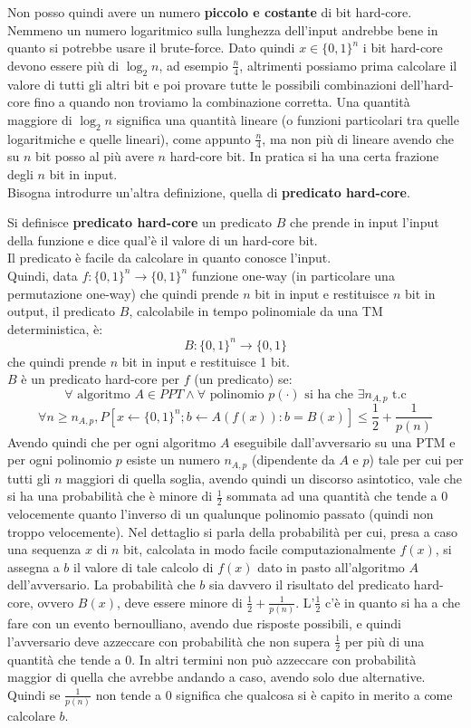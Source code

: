 \documentclass[a4paper,12pt, oneside]{book}
\begin{document}
Non posso quindi avere un numero \textbf{piccolo e costante} di bit hard-core.\\
Nemmeno un numero logaritmico sulla lunghezza dell'input andrebbe bene in
quanto si potrebbe usare il brute-force. Dato quindi $x\in\{0,1\}^n$ i bit
hard-core devono essere più di $\log_2n$, ad esempio $\frac{n}{4}$, altrimenti
possiamo prima calcolare il valore di tutti gli altri bit e poi provare tutte le
possibili combinazioni dell'hard-core fino a quando non troviamo la combinazione
corretta. Una quantità maggiore di $\log_2n$ significa una quantità lineare (o
funzioni particolari tra quelle logaritmiche e quelle lineari), come appunto
$\frac{n}{4}$, ma non più di 
lineare avendo che su $n$ bit posso al più avere $n$ hard-core bit. In pratica
si ha una certa frazione degli $n$ bit in input.\\
Bisogna introdurre un'altra definizione, quella di \textbf{predicato hard-core}.
\begin{definizione}
  Si definisce \textbf{predicato hard-core} un predicato $B$ che prende in input
  l'input della funzione e dice qual'è il valore di un hard-core bit.\\
  Il predicato è facile da calcolare in quanto conosce l'input.\\
  Quindi, data $f:\{0,1\}^n\to\{0,1\}^n$ funzione one-way (in particolare una
  permutazione one-way) che
  quindi prende $n$ bit in input e restituisce $n$ bit in output, il
  predicato $B$, calcolabile in tempo polinomiale da una TM deterministica, è: 
  \[B:\{0,1\}^n\to\{0,1\}\]
  che quindi prende $n$ bit in input e restituisce 1 bit.\\
  $B$ è un predicato hard-core per $f$ (un predicato) se:
  \[\forall \mbox{ algoritmo } A\in PPT\land\forall\mbox{ polinomio }p(\cdot)
    \mbox{ si ha che }\exists n_{A,p} \mbox{ t.c}\]
  \[\forall n\geq n_{A,p},P[x\gets \{0,1\}^n ; b \gets A( f ( x)) : b = B(
    x)]\leq\frac{1}{2}+\frac{1}{p(n)}\] 
  Avendo quindi che per ogni algoritmo $A$ eseguibile dall'avversario su una PTM
  e per ogni polinomio $p$ esiste un numero $n_{A,p}$ (dipendente da $A$ e $p$)
  tale per cui per tutti gli $n$ maggiori di quella soglia, avendo quindi un
  discorso asintotico, vale che si ha una probabilità che è minore di
  $\frac{1}{2}$ sommata ad una quantità che tende a 0 velocemente quanto
  l'inverso di un qualunque polinomio passato (quindi non troppo
  velocemente). Nel dettaglio si parla della probabilità per cui, presa a caso
  una sequenza $x$ di $n$ bit, calcolata in modo facile computazionalmente
  $f(x)$, si assegna a $b$ il valore di tale calcolo di $f(x)$ dato in pasto
  all'algoritmo $A$ dell'avversario. La probabilità che $b$ sia davvero il
  risultato del predicato hard-core, ovvero $B(x)$, deve essere minore di
  $\frac{1}{2}+\frac{1}{p(n)}$. L'$\frac{1}{2}$ c'è in quanto si ha a che fare
  con un evento bernoulliano, avendo due risposte possibili, e quindi
  l'avversario deve azzeccare con probabilità che non supera $\frac{1}{2}$ per
  più di una quantità che tende a 0. In altri termini non può azzeccare con
  probabilità maggior di quella che avrebbe andando a caso, avendo solo due
  alternative. Quindi se $\frac{1}{p(n)}$ non tende a 0 significa che qualcosa
  si è capito in merito a come calcolare $b$. 
\end{definizione}
\end{document}
